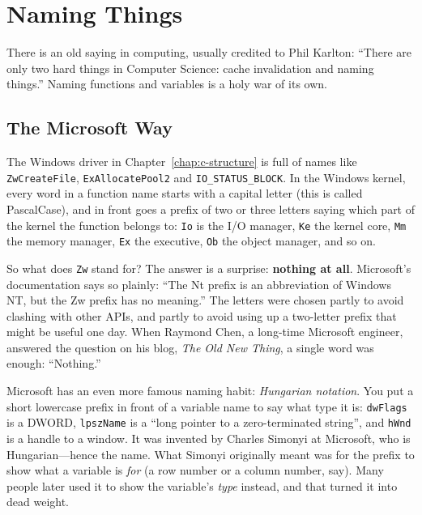 \section{Naming Things}

There is an old saying in computing, usually credited to Phil Karlton: ``There are only two hard things in Computer Science: cache invalidation and naming things.'' Naming functions and variables is a holy war of its own.

\subsection{The Microsoft Way}

The Windows driver in Chapter~\ref{chap:c-structure} is full of names like \texttt{ZwCreateFile}, \texttt{ExAllocatePool2} and \texttt{IO\_STATUS\_BLOCK}. In the Windows kernel, every word in a function name starts with a capital letter (this is called PascalCase), and in front goes a prefix of two or three letters saying which part of the kernel the function belongs to: \texttt{Io} is the I/O manager, \texttt{Ke} the kernel core, \texttt{Mm} the memory manager, \texttt{Ex} the executive, \texttt{Ob} the object manager, and so on.

So what does \texttt{Zw} stand for? The answer is a surprise: \textbf{nothing at all}. Microsoft's documentation says so plainly: ``The Nt prefix is an abbreviation of Windows NT, but the Zw prefix has no meaning.'' The letters were chosen partly to avoid clashing with other APIs, and partly to avoid using up a two-letter prefix that might be useful one day. When Raymond Chen, a long-time Microsoft engineer, answered the question on his blog, \emph{The Old New Thing}, a single word was enough: ``Nothing.''

Microsoft has an even more famous naming habit: \emph{Hungarian notation}. You put a short lowercase prefix in front of a variable name to say what type it is: \texttt{dwFlags} is a DWORD, \texttt{lpszName} is a ``long pointer to a zero-terminated string'', and \texttt{hWnd} is a handle to a window. It was invented by Charles Simonyi at Microsoft, who is Hungarian---hence the name. What Simonyi originally meant was for the prefix to show what a variable is \emph{for} (a row number or a column number, say). Many people later used it to show the variable's \emph{type} instead, and that turned it into dead weight.

